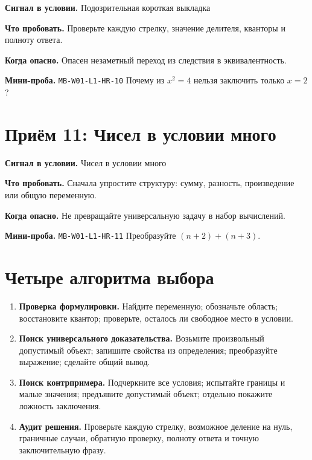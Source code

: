 \documentclass[11pt,a4paper,openany]{book}
\newcommand{\muid}[1]{\texttt{\footnotesize #1}}
\begin{document}
\begin{keybox}\textbf{Сигнал в условии.} Подозрительная короткая выкладка\par \textbf{Что пробовать.} Проверьте каждую стрелку, значение делителя, кванторы и полноту ответа.\end{keybox}

\textbf{Когда опасно.} Опасен незаметный переход из следствия в эквивалентность.\par \textbf{Мини-проба.} \muid{MB-W01-L1-HR-10} Почему из $x^2=4$ нельзя заключить только $x=2$?


\section{Приём 11: Чисел в условии много}

\begin{keybox}\textbf{Сигнал в условии.} Чисел в условии много\par \textbf{Что пробовать.} Сначала упростите структуру: сумму, разность, произведение или общую переменную.\end{keybox}

\textbf{Когда опасно.} Не превращайте универсальную задачу в набор вычислений.\par \textbf{Мини-проба.} \muid{MB-W01-L1-HR-11} Преобразуйте $(n+2)+(n+3)$.


\section{Четыре алгоритма выбора}
\begin{enumerate}
\item \textbf{Проверка формулировки.} Найдите переменную; обозначьте область; восстановите квантор; проверьте, осталось ли свободное место в условии.
\item \textbf{Поиск универсального доказательства.} Возьмите произвольный допустимый объект; запишите свойства из определения; преобразуйте выражение; сделайте общий вывод.
\item \textbf{Поиск контрпримера.} Подчеркните все условия; испытайте границы и малые значения; предъявите допустимый объект; отдельно покажите ложность заключения.
\item \textbf{Аудит решения.} Проверьте каждую стрелку, возможное деление на нуль, граничные случаи, обратную проверку, полноту ответа и точную заключительную фразу.
\end{enumerate}
\end{document}
